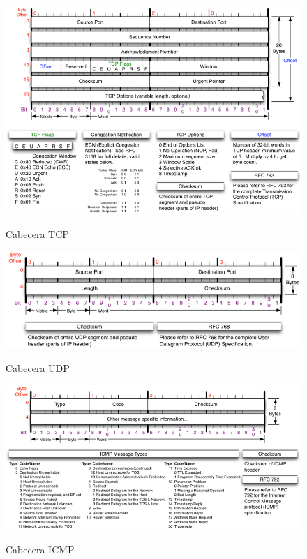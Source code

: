 \documentclass[12pt]{article}
\begin{document}
\begin{figure}[htbp]
\begin{center}
\includegraphics[scale=0.3]{TCP_header.png}\\[1cm] %
\caption{Cabecera TCP}
\end{center}
\end{figure}


\begin{figure}[htbp]
\begin{center}
\includegraphics[scale=0.3]{UDP_header.png}\\[1cm] %
\caption{Cabecera UDP}
\end{center}
\end{figure}


\begin{figure}[htbp]
\begin{center}
\includegraphics[scale=0.3]{ICMP_header.png}\\[1cm] %
\caption{Cabecera ICMP}
\end{center}
\end{figure}
\end{document}

